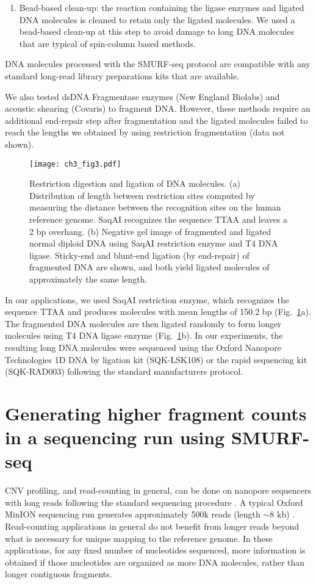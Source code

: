 \begin{enumerate}
\item Bead-based clean-up: the reaction containing the ligase enzymes and
  ligated DNA molecules is cleaned to retain only the ligated molecules. We
  used a bead-based clean-up at this step to avoid damage to long DNA
  molecules that are typical of spin-column based methods.
\end{enumerate}
DNA molecules processed with the SMURF-seq protocol are compatible with
any standard long-read library preparations kits that are available.

We also tested dsDNA Fragmentase enzymes (New England Biolabs) and
acoustic shearing (Covaris) to fragment DNA. However, these methods
require an additional end-repair step after fragmentation and the
ligated molecules failed to reach the lengths we obtained by using
restriction fragmentation (data not shown).

\begin{figure}[t!]
\centering
\texttt{[image: ch3\_fig3.pdf]}
\caption{Restriction digestion and ligation of DNA molecules.
  (a) Distribution of length between restriction sites computed
  by measuring the distance between the recognition sites on the human
  reference genome. SaqAI recognizes the sequence TTAA and leaves a 2 bp
  overhang.
  (b) Negative gel image of fragmented and ligated normal diploid DNA
  using SaqAI restriction enzyme and T4 DNA ligase.  Sticky-end and
  blunt-end ligation (by end-repair) of fragmented DNA are shown, and
  both yield ligated molecules of approximately the same length.}
\label{re_frag}
\end{figure}

In our applications, we used SaqAI restriction enzyme, which recognizes
the sequence TTAA and produces molecules with mean lengths of 150.2 bp
(Fig.~\ref{re_frag}a).
The fragmented DNA molecules are then ligated randomly to form longer
molecules using T4 DNA ligase enzyme (Fig.~\ref{re_frag}b).
In our experiments, the resulting long DNA molecules were sequenced
using the Oxford Nanopore Technologies 1D DNA by ligation kit
(SQK-LSK108) or the rapid sequencing kit (SQK-RAD003) following the
standard manufacturers protocol.


\section{Generating higher fragment counts in a sequencing run using
SMURF-seq}
CNV profiling, and read-counting in general, can be done on nanopore
sequencers with long reads following the standard sequencing procedure
\cite{euskirchen2017same}. A typical Oxford MinION sequencing run
generates approximately 500k reads (length $\sim$8 kb)
\cite{jain2018nanopore,tyson2018minion}.  Read-counting applications in
general do not benefit from longer reads beyond what is necessary for
unique mapping to the reference genome. In these applications, for any
fixed number of nucleotides sequenced, more information is obtained if
those nucleotides are organized as more DNA molecules, rather than
longer contiguous fragments.

